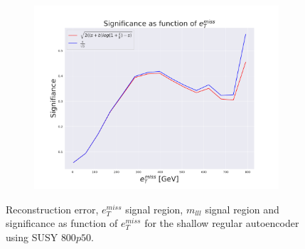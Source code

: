 \begin{figure}[H]
    \hfill  
    \begin{subfigure}{.60\textwidth}
        \includegraphics[width=\textwidth]{Figures/AE_testing/small/2lep/significance_etmiss_800p0p050_-1.6117055611472277.pdf}
        \caption{}
        \label{fig:AE_2lep_small_signi_800}
    \end{subfigure}
    \hfill      
    \caption[2lep shallow network | $800p50$ | AE]{Reconstruction error, $e_T^{miss}$ signal region, $m_{lll}$ signal region and significance as function of 
    $e_T^{miss}$ for the shallow regular autoencoder using SUSY $800p50$.}
    \label{fig:AE_2lep_small_rec_sig_signi_800}
\end{figure}


